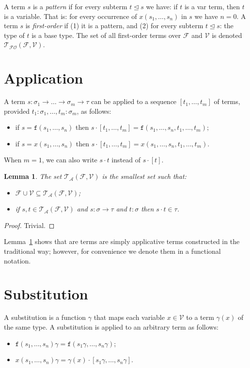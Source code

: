\documentclass{lmcs}
\theoremstyle{theorem}\newtheorem{theorem}{Theorem}
\theoremstyle{theorem}\newtheorem{lemma}[theorem]{Lemma}
\theoremstyle{theorem}\newtheorem{corollary}[theorem]{Corollary}
\theoremstyle{definition}\newtheorem{definition}[theorem]{Definition}
\theoremstyle{definition}\newtheorem{example}[theorem]{Example}
\newcommand{\F}{\mathcal{F}}
\newcommand{\V}{\mathcal{V}}
\newcommand{\ATerms}{\mathcal{T}_{\mathcal{A}}}
\newcommand{\FOTerms}{\mathcal{T}_{\mathcal{FO}}}
\newcommand{\atype}{\sigma}
\newcommand{\btype}{\tau}
\newcommand{\identifier}[1]{\mathtt{#1}}
\newcommand{\afun}{\identifier{f}}
\newcommand{\avar}{x}
\newcommand{\arrtype}{\rightarrow}
\newcommand{\subtermeq}{\unlhd}
\begin{document}
A term $s$ is a \emph{pattern} if for every subterm $t \subtermeq s$ we have: if $t$ is a var term,
then $t$ is a variable.  That is: for every occurrence of $\avar(s_1,\dots,s_n)$ in $s$ we have $n
= 0$.
A term $s$ is \emph{first-order} if (1) it is a pattern, and (2) for every subterm $t \subtermeq s$:
the type of $t$ is a base type.
The set of all first-order terms over $\F$ and $\V$ is denoted $\FOTerms(\F,\V)$.

\section{Application}

A term $s : \atype_1 \arrtype \dots \arrtype \atype_m \arrtype \btype$ can be applied to a sequence
$[t_1,\dots,t_m]$ of terms, provided $t_1 : \atype_1,\dots,t_m : \atype_m$, as follows:
\begin{itemize}
\item if $s = \afun(s_1,\dots,s_n)$ then $s \cdot [t_1,\dots,t_m] = \afun(s_1,\dots,s_n,t_1,\dots,
  t_m)$;
\item if $s = \avar(s_1,\dots,s_n)$ then $s \cdot [t_1,\dots,t_m] = \avar(s_1,\dots,s_n,t_1,\dots,
  t_m)$.
\end{itemize}
When $m = 1$, we can also write $s \cdot t$ instead of $s \cdot [t]$.

\begin{lemma}\label{lem:applicative_notation}
The set $\ATerms(\F,\V)$ is the smallest set such that:
\begin{itemize}
\item $\F \cup \V \subseteq \ATerms(\F,\V)$;
\item if $s,t \in \ATerms(\F,\V)$ and $s : \atype \arrtype \btype$ and $t : \atype$ then
  $s \cdot t \in \btype$.
\end{itemize}
\end{lemma}

\begin{proof}
Trivial.
\end{proof}

Lemma~\ref{lem:applicative_notation} shows that are terms are simply applicative terms
constructed in the traditional way; however, for convenience we denote them in a functional
notation.

\section{Substitution}

A substitution is a function $\gamma$ that maps each variable $\avar \in \V$ to a term
$\gamma(\avar)$ of the same type.  A substitution is applied to an arbitrary term as follows:
\begin{itemize}
\item $\afun(s_1,\dots,s_n)\gamma = \afun(s_1\gamma,\dots,s_n\gamma)$;
\item $\avar(s_1,\dots,s_n)\gamma = \gamma(\avar) \cdot [s_1\gamma,\dots,s_n\gamma]$.
\end{itemize}
\end{document}

